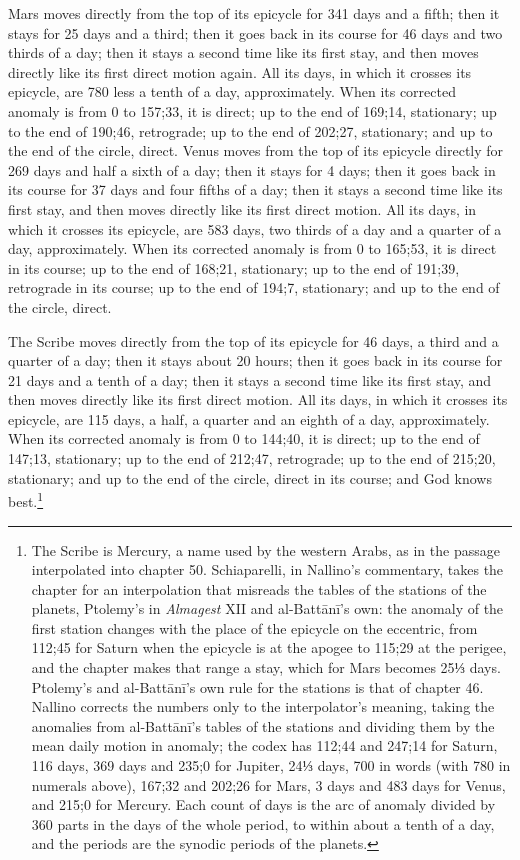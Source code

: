 \documentclass[11pt]{article}
\begin{document}
\par Mars moves directly from the top of its epicycle for 341 days and a fifth; then it stays for 25 days and a third; then it goes back in its course for 46 days and two thirds of a day; then it stays a second time like its first stay, and then moves directly like its first direct motion again. All its days, in which it crosses its epicycle, are 780 less a tenth of a day, approximately. When its corrected anomaly is from 0 to 157;33, it is direct; up to the end of 169;14, stationary; up to the end of 190;46, retrograde; up to the end of 202;27, stationary; and up to the end of the circle, direct. Venus moves from the top of its epicycle directly for 269 days and half a sixth of a day; then it stays for 4 days; then it goes back in its course for 37 days and four fifths of a day; then it stays a second time like its first stay, and then moves directly like its first direct motion. All its days, in which it crosses its epicycle, are 583 days, two thirds of a day and a quarter of a day, approximately. When its corrected anomaly is from 0 to 165;53, it is direct in its course; up to the end of 168;21, stationary; up to the end of 191;39, retrograde in its course; up to the end of 194;7, stationary; and up to the end of the circle, direct.\par
\par The Scribe moves directly from the top of its epicycle for 46 days, a third and a quarter of a day; then it stays about 20 hours; then it goes back in its course for 21 days and a tenth of a day; then it stays a second time like its first stay, and then moves directly like its first direct motion. All its days, in which it crosses its epicycle, are 115 days, a half, a quarter and an eighth of a day, approximately. When its corrected anomaly is from 0 to 144;40, it is direct; up to the end of 147;13, stationary; up to the end of 212;47, retrograde; up to the end of 215;20, stationary; and up to the end of the circle, direct in its course; and God knows best.\footnote{The Scribe is Mercury, a name used by the western Arabs, as in the passage interpolated into chapter 50. Schiaparelli, in Nallino's commentary, takes the chapter for an interpolation that misreads the tables of the stations of the planets, Ptolemy's in \emph{Almagest} XII and al-Battānī's own: the anomaly of the first station changes with the place of the epicycle on the eccentric, from 112;45 for Saturn when the epicycle is at the apogee to 115;29 at the perigee, and the chapter makes that range a stay, which for Mars becomes 25⅓ days. Ptolemy's and al-Battānī's own rule for the stations is that of chapter 46. Nallino corrects the numbers only to the interpolator's meaning, taking the anomalies from al-Battānī's tables of the stations and dividing them by the mean daily motion in anomaly; the codex has 112;44 and 247;14 for Saturn, 116 days, 369 days and 235;0 for Jupiter, 24⅓ days, 700 in words (with 780 in numerals above), 167;32 and 202;26 for Mars, 3 days and 483 days for Venus, and 215;0 for Mercury. Each count of days is the arc of anomaly divided by 360 parts in the days of the whole period, to within about a tenth of a day, and the periods are the synodic periods of the planets.}\par
\end{document}
